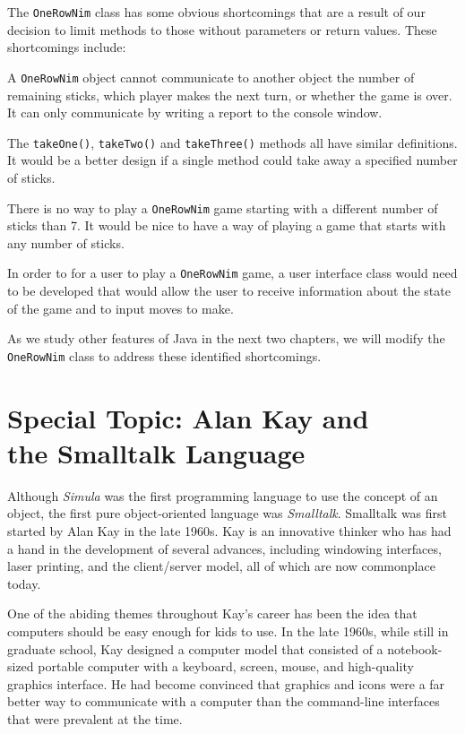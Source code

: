 The {\tt OneRowNim} class has some obvious shortcomings that are a
result of our decision to limit methods to those without parameters or
return values.  These shortcomings include:
\begin{BL}
\item   A {\tt OneRowNim} object cannot communicate to another object 
the number of remaining sticks, which player makes the next turn, or
whether the game is over.  It can only communicate by writing a report
to the console window.

\item  The {\tt takeOne()}, {\tt takeTwo()} and {\tt takeThree()} methods
all have similar definitions.  It would be a better design if a single
method could take away a specified number of sticks.

\item  There is no way to play a {\tt OneRowNim} game starting with 
a different number of sticks than 7.  It would be nice to have a way
of playing a game that starts with any number of sticks.

\item  In order to for a user to play a {\tt OneRowNim} game, a user interface
class would need to be developed that would allow the user to receive
information about the state of the game and to input moves to make.
\end{BL}

\noindent As we study other features of Java in the next two chapters, 
we will modify the {\tt OneRowNim} class to address these identified
shortcomings.

\section*{{\color{cyan}Special Topic:} Alan Kay and \\
\hspace*{20pt} the Smalltalk Language}

{\color{cyan}Although {\it Simula}} was the first programming language
to use the concept of an object, the first pure object-oriented
language was {\it Smalltalk}.  Smalltalk was first started by Alan Kay
in the late 1960s.  Kay is an innovative thinker who has had a hand in
the development of several advances, including windowing interfaces,
laser printing, and the client/server model, all of which are now
commonplace today.

One of the abiding themes throughout Kay's career has been the idea
that computers should be easy enough for kids to use.  In the late
1960s, while still in graduate school, Kay designed a computer model
that consisted of a notebook-sized portable computer with a keyboard,
screen, mouse, and high-quality graphics interface. He had become
convinced that graphics and icons were a far better way to communicate
with a computer than the command-line interfaces that were prevalent
at the time.

